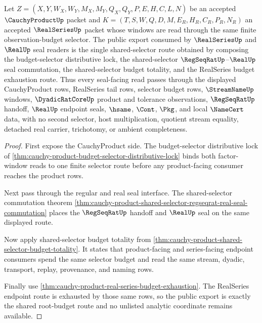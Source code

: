 \begin{theorem}
\label{thm:cauchyproduct-root-budget-public-export}
Let $Z=(X,Y,W_X,W_Y,M_X,M_Y,Q_X,Q_Y,P,E,H,C,L,N)$ be an accepted $\CauchyProductUp$ packet and $K=(T,S,W,Q,D,M,E_R,H_R,C_R,P_R,N_R)$ an accepted $\RealSeriesUp$ packet whose windows are read through the same finite observation-budget selector. The public export consumed by $\RealSeriesUp$ and $\RealUp$ seal readers is the single shared-selector route obtained by composing the budget-selector distributive lock, the shared-selector $\RegSeqRatUp$--$\RealUp$ seal commutation, the shared-selector budget totality, and the RealSeries budget exhaustion route. Thus every seal-facing read passes through the displayed CauchyProduct rows, RealSeries tail rows, selector budget rows, $\StreamNameUp$ windows, $\DyadicRatCoreUp$ product and tolerance observations, $\RegSeqRatUp$ handoff, $\RealUp$ endpoint seals, $\hsame$, $\Cont$, $\Pkg$, and local $\NameCert$ data, with no second selector, host multiplication, quotient stream equality, detached real carrier, trichotomy, or ambient completeness.
\end{theorem}
\begin{proof}
First expose the CauchyProduct side. The budget-selector distributive lock of \autoref{thm:cauchy-product-budget-selector-distributive-lock} binds both factor-window reads to one finite selector route before any product-facing consumer reaches the product rows.

Next pass through the regular and real seal interface. The shared-selector commutation theorem \autoref{thm:cauchy-product-shared-selector-regseqrat-real-seal-commutation} places the $\RegSeqRatUp$ handoff and $\RealUp$ seal on the same displayed route.

Now apply shared-selector budget totality from \autoref{thm:cauchy-product-shared-selector-budget-totality}. It states that product-facing and series-facing endpoint consumers spend the same selector budget and read the same stream, dyadic, transport, replay, provenance, and naming rows.

Finally use \autoref{thm:cauchy-product-real-series-budget-exhaustion}. The RealSeries endpoint route is exhausted by those same rows, so the public export is exactly the shared root-budget route and no unlisted analytic coordinate remains available.
\end{proof}

